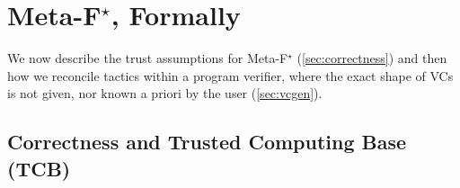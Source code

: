 \documentclass[runningheads]{llncs}
\newcommand\fstar{F$^\star$\xspace}
\newcommand\metafstar{Meta-F$^\star$\xspace}
\newcommand{\comm}[3]{\ifcheckpagebudget\else\ifdraft{{\color{#1}[#2: #3]}}\fi\fi}
\newcommand{\guido}[1]{\comm{blue}{Guido}{#1}}
\begin{document}



\section{\metafstar, Formally}

We now describe the trust assumptions for \metafstar
(\autoref{sec:correctness}) and then how we reconcile tactics within a
program verifier, where the exact shape of VCs is not given, nor known
a priori by the user (\autoref{sec:vcgen}).


\subsection{Correctness and Trusted Computing Base (TCB)}
\label{sec:correctness}
\end{document}
